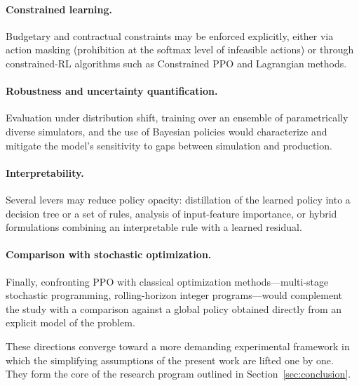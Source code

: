\paragraph{Constrained learning.}
Budgetary and contractual constraints may be enforced explicitly, either
via action masking (prohibition at the softmax level of infeasible actions)
or through constrained-RL algorithms such as Constrained PPO and Lagrangian
methods.

\paragraph{Robustness and uncertainty quantification.}
Evaluation under distribution shift, training over an ensemble of
parametrically diverse simulators, and the use of Bayesian policies would
characterize and mitigate the model's sensitivity to gaps between
simulation and production.

\paragraph{Interpretability.}
Several levers may reduce policy opacity: distillation of the learned policy
into a decision tree or a set of rules, analysis of input-feature
importance, or hybrid formulations combining an interpretable rule with a
learned residual.

\paragraph{Comparison with stochastic optimization.}
Finally, confronting PPO with classical optimization methods---multi-stage
stochastic programming, rolling-horizon integer programs---would complement
the study with a comparison against a global policy obtained directly from
an explicit model of the problem.

\bigskip
\noindent
These directions converge toward a more demanding experimental framework in
which the simplifying assumptions of the present work are lifted one by one.
They form the core of the research program outlined in
Section~\ref{sec:conclusion}.
